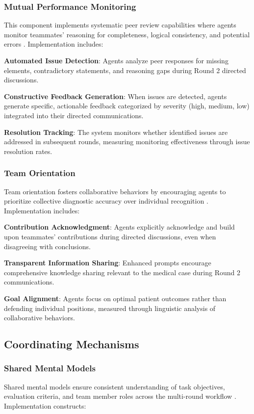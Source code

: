\documentclass[letterpaper]{article} %
\begin{document}
\subsubsection{Mutual Performance Monitoring}
This component implements systematic peer review capabilities where agents monitor teammates' reasoning for completeness, logical consistency, and potential errors \cite{marks2001team}. Implementation includes:

\textbf{Automated Issue Detection}: Agents analyze peer responses for missing elements, contradictory statements, and reasoning gaps during Round 2 directed discussions.

\textbf{Constructive Feedback Generation}: When issues are detected, agents generate specific, actionable feedback categorized by severity (high, medium, low) integrated into their directed communications.

\textbf{Resolution Tracking}: The system monitors whether identified issues are addressed in subsequent rounds, measuring monitoring effectiveness through issue resolution rates.

\subsubsection{Team Orientation}
Team orientation fosters collaborative behaviors by encouraging agents to prioritize collective diagnostic accuracy over individual recognition \cite{eby1997collectivistic}. Implementation includes:

\textbf{Contribution Acknowledgment}: Agents explicitly acknowledge and build upon teammates' contributions during directed discussions, even when disagreeing with conclusions.

\textbf{Transparent Information Sharing}: Enhanced prompts encourage comprehensive knowledge sharing relevant to the medical case during Round 2 communications.

\textbf{Goal Alignment}: Agents focus on optimal patient outcomes rather than defending individual positions, measured through linguistic analysis of collaborative behaviors.

\subsection{Coordinating Mechanisms}

\subsubsection{Shared Mental Models}
Shared mental models ensure consistent understanding of task objectives, evaluation criteria, and team member roles across the multi-round workflow \cite{stout1999planning}. Implementation constructs:
\end{document}
